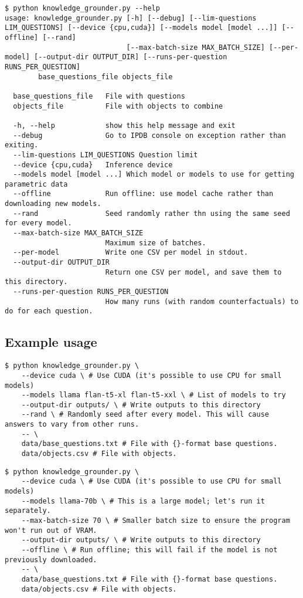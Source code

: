 \begin{lstlisting}
$ python knowledge_grounder.py --help
usage: knowledge_grounder.py [-h] [--debug] [--lim-questions LIM_QUESTIONS] [--device {cpu,cuda}] [--models model [model ...]] [--offline] [--rand]
                             [--max-batch-size MAX_BATCH_SIZE] [--per-model] [--output-dir OUTPUT_DIR] [--runs-per-question RUNS_PER_QUESTION]
		base_questions_file objects_file

  base_questions_file   File with questions
  objects_file          File with objects to combine

  -h, --help            show this help message and exit
  --debug               Go to IPDB console on exception rather than exiting.
  --lim-questions LIM_QUESTIONS Question limit
  --device {cpu,cuda}   Inference device
  --models model [model ...] Which model or models to use for getting parametric data
  --offline             Run offline: use model cache rather than downloading new models.
  --rand                Seed randomly rather thn using the same seed for every model.
  --max-batch-size MAX_BATCH_SIZE
                        Maximum size of batches.
  --per-model           Write one CSV per model in stdout.
  --output-dir OUTPUT_DIR
                        Return one CSV per model, and save them to this directory.
  --runs-per-question RUNS_PER_QUESTION
                        How many runs (with random counterfactuals) to do for each question.
\end{lstlisting}

\subsection{Example usage}

\begin{lstlisting}[caption={Example usage: run three models with random data.}]
$ python knowledge_grounder.py \
    --device cuda \ # Use CUDA (it's possible to use CPU for small models)
    --models llama flan-t5-xl flan-t5-xxl \ # List of models to try
    --output-dir outputs/ \ # Write outputs to this directory
    --rand \ # Randomly seed after every model. This will cause answers to vary from other runs.
    -- \
    data/base_questions.txt # File with {}-format base questions.
    data/objects.csv # File with objects.
\end{lstlisting}

\begin{lstlisting}[caption={Example usage: run one of the models with 0 seed, to ensure repeteability}]
$ python knowledge_grounder.py \
    --device cuda \ # Use CUDA (it's possible to use CPU for small models)
    --models llama-70b \ # This is a large model; let's run it separately.
    --max-batch-size 70 \ # Smaller batch size to ensure the program won't run out of VRAM.
    --output-dir outputs/ \ # Write outputs to this directory
    --offline \ # Run offline; this will fail if the model is not previously downloaded.
    -- \
    data/base_questions.txt # File with {}-format base questions.
    data/objects.csv # File with objects.
\end{lstlisting}
